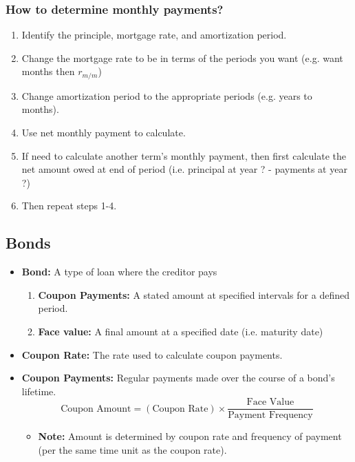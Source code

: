 \subsubsection{How to determine monthly payments?}
\begin{process}
    \begin{enumerate}
        \item Identify the principle, mortgage rate, and amortization period.
        \item Change the mortgage rate to be in terms of the periods you want (e.g. want months then $r_{m/m}$)
        \item Change amortization period to the appropriate periods (e.g. years to months).
        \item Use net monthly payment to calculate.
        \item If need to calculate another term's monthly payment, then first calculate the net amount owed at end of period (i.e. principal at year ? - payments at year ?)
        \item Then repeat steps 1-4.
    \end{enumerate}
\end{process}

\subsection{Bonds}
\begin{terminology}
    \begin{itemize}
        \item \textbf{Bond:} A type of loan where the creditor pays
        \begin{enumerate}
            \item \textbf{Coupon Payments:} A stated amount at specified intervals for a defined period.
            \item \textbf{Face value:} A final amount at a specified date (i.e. maturity date)
        \end{enumerate}
        \item \textbf{Coupon Rate:} The rate used to calculate coupon payments.
        \item \textbf{Coupon Payments:} Regular payments made over the course of a bond’s lifetime. 
        \begin{equation}
            \text{Coupon Amount} = (\text{Coupon Rate}) \times \frac{\text{Face Value}}{\text{Payment Frequency}}
        \end{equation}
        \begin{itemize}
            \item \textbf{Note:} Amount is determined by coupon rate and frequency of payment (per the same time unit as the coupon rate).
        \end{itemize}
    \end{itemize}
\end{terminology}

